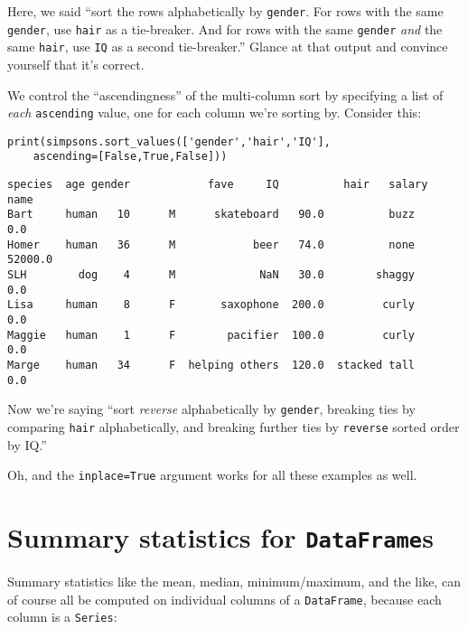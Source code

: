 Here, we said ``sort the rows alphabetically by \texttt{gender}. For rows with
the same \texttt{gender}, use \texttt{hair} as a tie-breaker. And for rows with
the same \texttt{gender} \textit{and} the same \texttt{hair}, use \texttt{IQ}
as a second tie-breaker.'' Glance at that output and convince yourself that
it's correct.

We control the ``ascendingness'' of the multi-column sort by specifying a list
of \textit{each} \texttt{ascending} value, one for each column we're sorting
by. Consider this:

\begin{samepage}
\begin{Verbatim}[fontsize=\small,samepage=true,frame=single,framesep=3mm]
print(simpsons.sort_values(['gender','hair','IQ'],
    ascending=[False,True,False]))
\end{Verbatim}
\vspace{-.2in}

\begin{Verbatim}[fontsize=\scriptsize,samepage=true,frame=leftline,framesep=5mm,framerule=1mm]
       species  age gender            fave     IQ          hair   salary
name                                                                    
Bart     human   10      M      skateboard   90.0          buzz      0.0
Homer    human   36      M            beer   74.0          none  52000.0
SLH        dog    4      M             NaN   30.0        shaggy      0.0
Lisa     human    8      F       saxophone  200.0         curly      0.0
Maggie   human    1      F        pacifier  100.0         curly      0.0
Marge    human   34      F  helping others  120.0  stacked tall      0.0
\end{Verbatim}
\end{samepage}

Now we're saying ``sort \textit{reverse} alphabetically by \texttt{gender},
breaking ties by comparing \texttt{hair} alphabetically, and breaking further
ties by \texttt{reverse} sorted order by IQ.''

Oh, and the \texttt{inplace=True} argument works for all these examples as
well.

\section{Summary statistics for \texttt{DataFrame}s}


Summary statistics like the mean, median, minimum/maximum, and the like, can of
course all be computed on individual columns of a \texttt{DataFrame}, because
each column is a \texttt{Series}:

